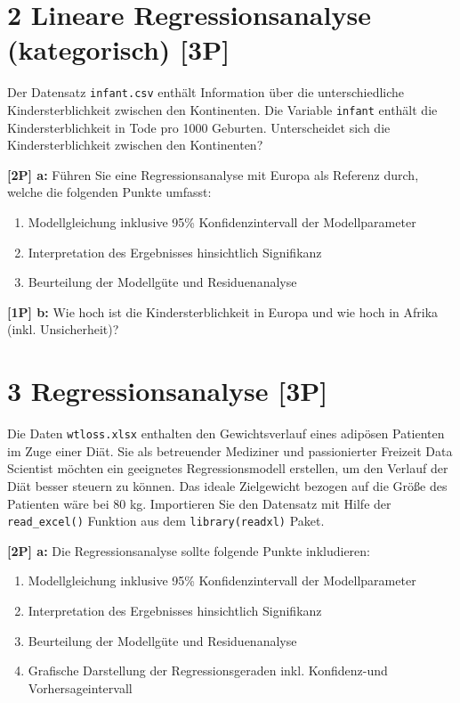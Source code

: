 \documentclass[
]{article}
\providecommand{\tightlist}{%
  \setlength{\itemsep}{0pt}\setlength{\parskip}{0pt}}
\begin{document}
\hypertarget{lineare-regressionsanalyse-kategorisch-3p}{%
\section{2 Lineare Regressionsanalyse (kategorisch)
{[}3P{]}}\label{lineare-regressionsanalyse-kategorisch-3p}}

Der Datensatz \texttt{infant.csv} enthält Information über die
unterschiedliche Kindersterblichkeit zwischen den Kontinenten. Die
Variable \texttt{infant} enthält die Kindersterblichkeit in Tode pro
1000 Geburten. Unterscheidet sich die Kindersterblichkeit zwischen den
Kontinenten?

\textbf{{[}2P{]} a:} Führen Sie eine Regressionsanalyse mit Europa als
Referenz durch, welche die folgenden Punkte umfasst:

\begin{enumerate}
\def\labelenumi{\roman{enumi})}
\tightlist
\item
  Modellgleichung inklusive 95\% Konfidenzintervall der Modellparameter
\item
  Interpretation des Ergebnisses hinsichtlich Signifikanz
\item
  Beurteilung der Modellgüte und Residuenanalyse
\end{enumerate}

\textbf{{[}1P{]} b:} Wie hoch ist die Kindersterblichkeit in Europa und
wie hoch in Afrika (inkl. Unsicherheit)?

\hypertarget{regressionsanalyse-3p}{%
\section{3 Regressionsanalyse {[}3P{]}}\label{regressionsanalyse-3p}}

Die Daten \texttt{wtloss.xlsx} enthalten den Gewichtsverlauf eines
adipösen Patienten im Zuge einer Diät. Sie als betreuender Mediziner und
passionierter Freizeit Data Scientist möchten ein geeignetes
Regressionsmodell erstellen, um den Verlauf der Diät besser steuern zu
können. Das ideale Zielgewicht bezogen auf die Größe des Patienten wäre
bei 80 kg. Importieren Sie den Datensatz mit Hilfe der
\texttt{read\_excel()} Funktion aus dem \texttt{library(readxl)} Paket.

\textbf{{[}2P{]} a:} Die Regressionsanalyse sollte folgende Punkte
inkludieren:

\begin{enumerate}
\def\labelenumi{\roman{enumi})}
\tightlist
\item
  Modellgleichung inklusive 95\% Konfidenzintervall der Modellparameter
\item
  Interpretation des Ergebnisses hinsichtlich Signifikanz
\item
  Beurteilung der Modellgüte und Residuenanalyse
\item
  Grafische Darstellung der Regressionsgeraden inkl. Konfidenz-und
  Vorhersageintervall
\end{enumerate}
\end{document}
